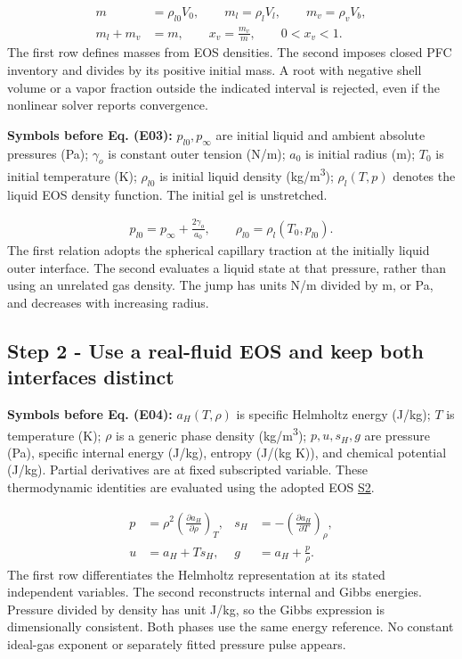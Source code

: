 \documentclass[10pt,a4paper]{article}
\begin{document}
{\small\begin{align*}
m&=\rho_{l0}V_0,\qquad m_l=\rho_lV_l,\qquad m_v=\rho_vV_b,\\
m_l+m_v&=m,\qquad x_v=\frac{m_v}{m},\qquad 0<x_v<1. \tag{E02}
\end{align*}}
The first row defines masses from EOS densities. The second imposes closed PFC inventory and divides by its positive initial mass. A root with negative shell volume or a vapor fraction outside the indicated interval is rejected, even if the nonlinear solver reports convergence.

\textbf{Symbols before Eq. (E03):} $p_{l0},p_\infty$ are initial liquid and ambient absolute pressures (Pa); $\gamma_o$ is constant outer tension (N/m); $a_0$ is initial radius (m); $T_0$ is initial temperature (K); $\rho_{l0}$ is initial liquid density (kg/m\textsuperscript{3}); $\rho_l(T,p)$ denotes the liquid EOS density function. The initial gel is unstretched.

{\small\begin{align*}
p_{l0}=p_\infty+\frac{2\gamma_o}{a_0},\qquad
\rho_{l0}=\rho_l(T_0,p_{l0}). \tag{E03}
\end{align*}}
The first relation adopts the spherical capillary traction at the initially liquid outer interface. The second evaluates a liquid state at that pressure, rather than using an unrelated gas density. The jump has units N/m divided by m, or Pa, and decreases with increasing radius.

\subsection*{Step 2  -  Use a real-fluid EOS and keep both interfaces distinct}
\textbf{Symbols before Eq. (E04):} $a_H(T,\rho)$ is specific Helmholtz energy (J/kg); $T$ is temperature (K); $\rho$ is a generic phase density (kg/m\textsuperscript{3}); $p,u,s_H,g$ are pressure (Pa), specific internal energy (J/kg), entropy (J/(kg K)), and chemical potential (J/kg). Partial derivatives are at fixed subscripted variable. These thermodynamic identities are evaluated using the adopted EOS \href{../../SOURCES.md}{S2}.

{\small\begin{align*}
p&=\rho^2\left(\frac{\partial a_H}{\partial\rho}\right)_T,
&s_H&=-\left(\frac{\partial a_H}{\partial T}\right)_\rho,\\
u&=a_H+Ts_H,
&g&=a_H+\frac{p}{\rho}. \tag{E04}
\end{align*}}
The first row differentiates the Helmholtz representation at its stated independent variables. The second reconstructs internal and Gibbs energies. Pressure divided by density has unit J/kg, so the Gibbs expression is dimensionally consistent. Both phases use the same energy reference. No constant ideal-gas exponent or separately fitted pressure pulse appears.
\end{document}
